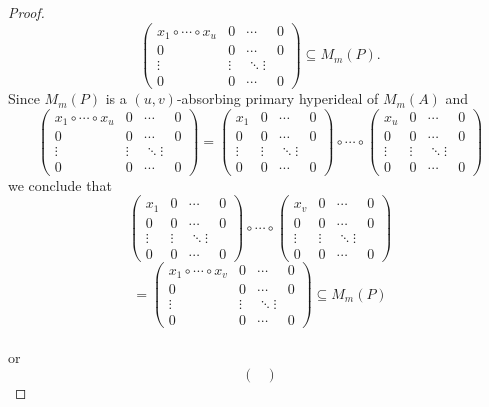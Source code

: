 \documentclass[preprint,review,10pt]{amsart}
\theoremstyle{definition}
\theoremstyle{remark}
\numberwithin{equation}{section}
\begin{document}
\begin{proof}
\[\begin{pmatrix}
x_1 \circ \cdots \circ x_u & 0 & \cdots & 0 \\
0 & 0 & \cdots & 0 \\
\vdots & \vdots & \ddots \vdots \\
0 & 0 & \cdots & 0 
\end{pmatrix}
\subseteq M_m(P).\]
Since $M_m(P)$ is a $(u,v)$-absorbing primary hyperideal of $M_m(A)$ and 
\[ \begin{pmatrix}
x_1 \circ \cdots \circ x_u & 0 & \cdots & 0\\
0 & 0 & \cdots & 0\\
\vdots & \vdots & \ddots \vdots\\
0 & 0 & \cdots & 0
\end{pmatrix}
=
\begin{pmatrix}
x_1 & 0 & \cdots & 0\\
0 & 0 & \cdots & 0\\
\vdots & \vdots & \ddots \vdots\\
0 & 0 & \cdots & 0
\end{pmatrix}
\circ \cdots \circ
\begin{pmatrix}
x_u & 0 & \cdots & 0\\
0 & 0 & \cdots & 0\\
\vdots & \vdots & \ddots \vdots\\
0 & 0 & \cdots & 0
\end{pmatrix}
\]
we conclude that 
\[ \begin{pmatrix}
x_1 & 0 & \cdots & 0\\
0 & 0 & \cdots & 0\\
\vdots& \vdots & \ddots \vdots\\
0 & 0 & \cdots & 0
\end{pmatrix} 
\circ \cdots \circ
\begin{pmatrix}
x_v & 0 & \cdots & 0\\
0 & 0 & \cdots & 0\\
\vdots& \vdots & \ddots \vdots\\
0 & 0 & \cdots & 0
\end{pmatrix}\]
\[=
\begin{pmatrix}
x_1 \circ \cdots \circ x_v & 0 & \cdots & 0\\
0 & 0 & \cdots & 0\\
\vdots& \vdots & \ddots \vdots\\
0 & 0 & \cdots & 0
\end{pmatrix}
\subseteq M_m(P)\]\\
or 
\[ \begin{pmatrix}

\end{pmatrix}\]
\end{proof}
\end{document}
